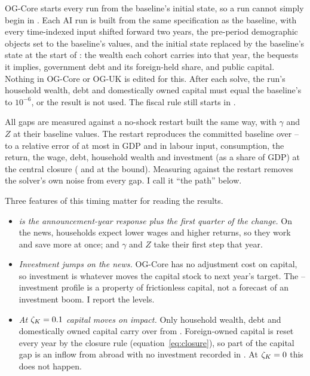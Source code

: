 OG-Core starts every run from the baseline's initial state, so a run cannot simply begin in \genShockYear{}. Each AI run is built from the same \genStartYear{} specification as the baseline, with every time-indexed input shifted forward two years, the pre-period demographic objects set to the baseline's \genRampZeroYear{} values, and the initial state replaced by the baseline's state at the start of \genShockYear{}: the wealth each cohort carries into that year, the bequests it implies, government debt and its foreign-held share, and public capital. Nothing in OG-Core or OG-UK is edited for this. After each solve, the run's \genShockYear{} household wealth, debt and domestically owned capital must equal the baseline's to $10^{-6}$, or the result is not used. The fiscal rule still starts in \genDebtRuleYear{}.

All gaps are measured against a no-shock restart built the same way, with $\gamma$ and $Z$ at their baseline values. The restart reproduces the committed baseline over \genShockYear--\genDebtRuleYear{} to a relative error of at most \genGateYCentral{} in GDP and \genGateMaxCentral{} in labour input, consumption, the return, the wage, debt, household wealth and investment (as a share of GDP) at the central closure (\genGateYBound{} and \genGateMaxBound{} at the bound). Measuring against the restart removes the solver's own noise from every gap. I call it ``the path'' below.

Three features of this timing matter for reading the results.
\begin{itemize}
\item \emph{\genShockYear{} is the announcement-year response plus the first quarter of the change.} On the news, households expect lower wages and higher returns, so they work and save more at once; and $\gamma$ and $Z$ take their first step that year.
\item \emph{Investment jumps on the news.} OG-Core \genOgcoreVersion{} has no adjustment cost on capital, so investment is whatever moves the capital stock to next year's target. The \genShockYear--\genYearTwoAfterShock{} investment profile is a property of frictionless capital, not a forecast of an investment boom. I report the \genHeadYear{} levels.
\item \emph{At $\zeta_K = 0.1{}$ capital moves on impact.} Only household wealth, debt and domestically owned capital carry over from \genRampZeroYear{}. Foreign-owned capital is reset every year by the closure rule (equation~\ref{eq:closure}), so part of the \genShockYear{} capital gap is an inflow from abroad with no investment recorded in \genRampZeroYear{}. At $\zeta_K = 0{}$ this does not happen.
\end{itemize}

